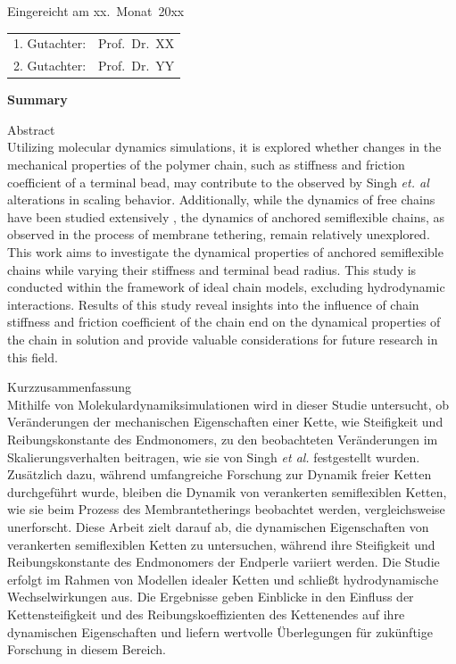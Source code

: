 \documentclass[
    paper=A4,pagesize=automedia,fontsize=12pt,
    BCOR=15mm,DIV=22,
    twoside,headinclude,footinclude=false,
    fleqn,             %
    bibliography=totocnumbered,          %
    listof=totoc,                %
    listof=flat,                 %
    cleardoublepage=empty      %
    numbers=endperiod
]{scrartcl}
\begin{document}
\thispagestyle{empty}\vspace*{48em}

Eingereicht am xx.~Monat~20xx\vspace{1.5em}
\par{\large\begin{tabular}{ll}
        1. Gutachter: & Prof.~Dr.~XX \\
        2. Gutachter: & Prof.~Dr.~YY \\
    \end{tabular}}


\newpage
\begin{center}\large\bfseries Summary\end{center}


Abstract \\
Utilizing molecular dynamics simulations, it is explored whether changes 
in the mechanical properties of the polymer chain, such as 
stiffness and friction coefficient of a terminal bead, may contribute to the 
observed by Singh \emph{et. al} \cite{Singh:2022} alterations in scaling behavior. 
Additionally, while the dynamics of free chains have been studied extensively 
\cite{Nikoubashman2016} \cite{Singh:2022}, 
the dynamics of anchored semiflexible chains, as observed in the process of 
membrane tethering, remain relatively unexplored. This work aims to investigate 
the dynamical properties of anchored semiflexible chains while varying their 
stiffness and terminal bead radius. This study is conducted within the 
framework of ideal chain models, 
excluding hydrodynamic interactions. Results of this study reveal insights 
into the influence of chain stiffness and friction coefficient of the chain end
on the dynamical properties of the chain in solution and provide 
valuable considerations for future research in this field.


\vspace{15em}
Kurzzusammenfassung \\
Mithilfe von Molekulardynamiksimulationen wird in dieser Studie untersucht, 
ob Veränderungen der mechanischen Eigenschaften einer Kette, 
wie Steifigkeit und Reibungskonstante des Endmonomers, 
zu den beobachteten Veränderungen im Skalierungsverhalten beitragen, 
wie sie von Singh \emph{et al.} \cite{Singh:2022} festgestellt wurden. 
Zusätzlich dazu, während umfangreiche Forschung zur Dynamik freier Ketten 
durchgeführt wurde, bleiben die Dynamik von verankerten semiflexiblen Ketten, 
wie sie beim Prozess des Membrantetherings beobachtet werden, 
vergleichsweise unerforscht. Diese Arbeit zielt darauf ab, die dynamischen 
Eigenschaften von verankerten semiflexiblen Ketten zu untersuchen, 
während ihre Steifigkeit und Reibungskonstante des Endmonomers der Endperle 
variiert werden. Die Studie erfolgt im Rahmen von Modellen idealer Ketten und schließt 
hydrodynamische Wechselwirkungen aus. Die Ergebnisse geben Einblicke in den 
Einfluss der Kettensteifigkeit und des Reibungskoeffizienten des Kettenendes auf 
ihre dynamischen Eigenschaften und liefern wertvolle Überlegungen für 
zukünftige Forschung in diesem Bereich.
\end{document}
